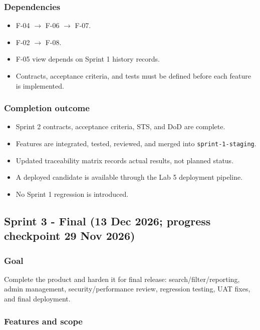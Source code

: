 \documentclass[11pt,a4paper]{article}
\begin{document}
\subsubsection{Dependencies}

\begin{itemize}[leftmargin=*,itemsep=2pt,topsep=2pt]
  \item F-04 $\rightarrow$ F-06 $\rightarrow$ F-07.
  \item F-02 $\rightarrow$ F-08.
  \item F-05 view depends on Sprint 1 history records.
  \item Contracts, acceptance criteria, and tests must be defined before each feature is implemented.
\end{itemize}
\subsubsection{Completion outcome}

\begin{itemize}[leftmargin=*,itemsep=2pt,topsep=2pt]
  \item Sprint 2 contracts, acceptance criteria, STS, and DoD are complete.
  \item Features are integrated, tested, reviewed, and merged into \texttt{sprint-1-staging}.
  \item Updated traceability matrix records actual results, not planned status.
  \item A deployed candidate is available through the Lab 5 deployment pipeline.
  \item No Sprint 1 regression is introduced.
\end{itemize}

\subsection{Sprint 3 - Final (13 Dec 2026; progress checkpoint 29 Nov 2026)}

\subsubsection{Goal}

Complete the product and harden it for final release: search/filter/reporting, admin management, security/performance review, regression testing, UAT fixes, and final deployment.\\

\subsubsection{Features and scope}
\end{document}
